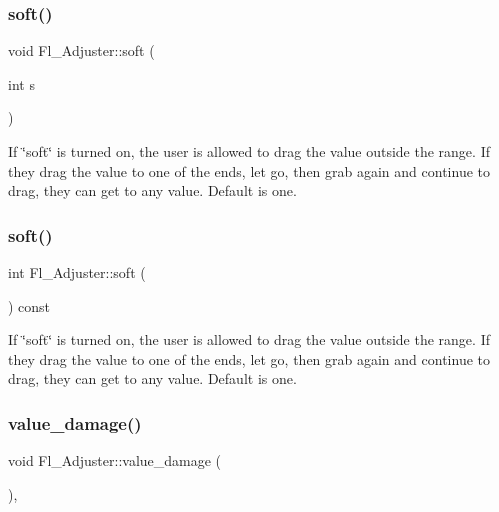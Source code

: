 \mbox{\label{class_fl___adjuster_a3cf531bc0d367428f38fa8f287af197e}} 
\subsubsection{\texorpdfstring{soft()}{soft()}\hspace{0.1cm}{\footnotesize\ttfamily [1/2]}}
{\footnotesize\ttfamily void Fl\+\_\+\+Adjuster\+::soft (\begin{DoxyParamCaption}\item[{int}]{s }\end{DoxyParamCaption})\hspace{0.3cm}{\ttfamily [inline]}}

If \char`\"{}soft\char`\"{} is turned on, the user is allowed to drag the value outside the range. If they drag the value to one of the ends, let go, then grab again and continue to drag, they can get to any value. Default is one. \mbox{\label{class_fl___adjuster_a40e5401a069d6f140e4a5636a852a28c}} 
\subsubsection{\texorpdfstring{soft()}{soft()}\hspace{0.1cm}{\footnotesize\ttfamily [2/2]}}
{\footnotesize\ttfamily int Fl\+\_\+\+Adjuster\+::soft (\begin{DoxyParamCaption}{ }\end{DoxyParamCaption}) const\hspace{0.3cm}{\ttfamily [inline]}}

If \char`\"{}soft\char`\"{} is turned on, the user is allowed to drag the value outside the range. If they drag the value to one of the ends, let go, then grab again and continue to drag, they can get to any value. Default is one. \mbox{\label{class_fl___adjuster_ab53a7e10eb85b94f1c305b1bbb9c1506}} 
\subsubsection{\texorpdfstring{value\+\_\+damage()}{value\_damage()}}
{\footnotesize\ttfamily void Fl\+\_\+\+Adjuster\+::value\+\_\+damage (\begin{DoxyParamCaption}{ }\end{DoxyParamCaption})\hspace{0.3cm}{\ttfamily [protected]}, {\ttfamily [virtual]}}



